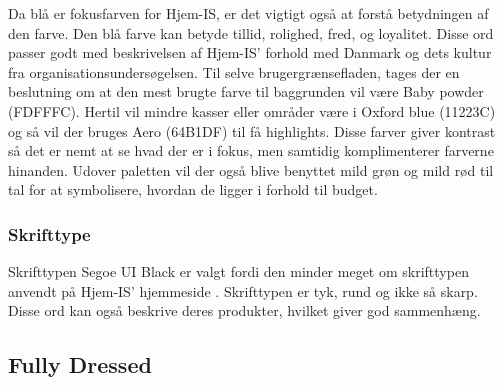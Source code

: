 Da blå er fokusfarven for Hjem-IS, er det vigtigt også at forstå betydningen af den farve. Den blå farve kan betyde tillid, rolighed, fred, og loyalitet. Disse ord passer godt med beskrivelsen af Hjem-IS' forhold med Danmark og dets kultur fra organisationsundersøgelsen. Til selve brugergrænsefladen, tages der en beslutning om at den mest brugte farve til baggrunden vil være Baby powder (FDFFFC). Hertil vil mindre kasser eller områder være i Oxford blue (11223C) og så vil der bruges Aero (64B1DF) til få highlights. Disse farver giver kontrast så det er nemt at se hvad der er i fokus, men samtidig komplimenterer farverne hinanden. Udover paletten vil der også blive benyttet mild grøn og mild rød til tal for at symbolisere, hvordan de ligger i forhold til budget.

\subsubsection{Skrifttype}
Skrifttypen Segoe UI Black er valgt fordi den minder meget om skrifttypen anvendt på Hjem-IS' hjemmeside \cite{hjemis}. Skrifttypen er tyk, rund og ikke så skarp. Disse ord kan også beskrive deres produkter, hvilket giver god sammenhæng.



\subsection{Fully Dressed}
